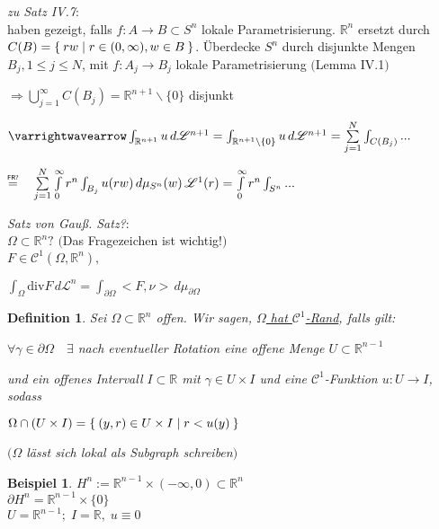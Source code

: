 \documentclass[11pt]{memoir}
\theoremstyle{changebreak}
\newtheorem{Definition}{Definition}[chapter]
\newtheorem{Beispiel}{Beispiel}[chapter]
\newcommand\overequal[1]{\mathrel{\overset{\makebox[0pt]{\mbox{\normalfont\tiny\sffamily $ #1 $}}}{=}}}
\begin{document}
\par\bigskip

\emph{zu Satz IV.7}: \\

haben gezeigt, falls $f: A \rightarrow B \subset S^n$ lokale Parametrisierung. $\mathbb R^n$ ersetzt durch $C(B) = \Set{rw | r \in (0, \infty), w \in B}$. Überdecke $S^n$ durch disjunkte Mengen $B_j, 1 \leq j \leq N$, mit
$f:A_j \rightarrow B_j$ lokale Parametrisierung $($Lemma IV.1$)$ 
\par
$\Rightarrow \bigcup\limits_{j=1}^\infty C(B_j) = \mathbb R^{n+1}\backslash \{0\}$ disjunkt 
\par\bigskip
$\varrightwavearrow \int_{\mathbb R^{n+1}} u \, d\mathscr L^{n+1} = \int_{\mathbb R^{n+1}\backslash \{0\}} u \, d \mathscr L^{n+1} = \sum\limits_{j=1}^N \int_{C(B_j)}...$
\par\bigskip
$\overequal{\text{FR?}} \quad \sum\limits_{j=1}^N \int\limits_0^\infty r^n \int_{B_j} u(rw) \,d\mu_{S^n}(w) \, \mathscr L^1(r) = \int\limits_0^\infty r^n \int_{S^n}...$


\par\bigskip
\emph{Satz von Gauß. Satz?}:\\
$\Omega \subset \mathbb R^n?$ $($Das Fragezeichen ist wichtig!$)$ \\
$F \in \mathscr C^1(\Omega, \mathbb R^n),$
\begin{center}
	$\int_\Omega \text{div} F \, d\mathscr L^n = \int_{\partial\Omega} <F, \nu> \, d\mu_{\partial\Omega}$
\end{center}

\begin{Definition}
Sei $\Omega \subset \mathbb R^n$ offen. Wir sagen, \underline{$\Omega$ hat $\mathscr C^1$-Rand}, falls gilt:
\begin{center}
	$\forall \gamma \in \partial\Omega \quad \exists$ nach eventueller Rotation eine offene Menge $U \subset \mathbb R^{n-1}$ 
\end{center}
und ein offenes Intervall $I \subset \mathbb R$ mit $\gamma \in U \times I$ und eine $\mathscr C^1$-Funktion $u: U \rightarrow I$, sodass 
\begin{center}
	$\Omega \cap (U \times I) = \Set{(y, r) \in U \times I | r < u(y)}$ 
\end{center}
$(\Omega$ lässt sich lokal als Subgraph schreiben$)$
\end{Definition}


\begin{Beispiel}
$H^n := \mathbb R^{n-1} \times (-\infty, 0) \subset \mathbb R^n$ \\
$\partial H^n = \mathbb R^{n-1} \times \{0\}$ \\
$U = \mathbb R^{n-1};\; I = \mathbb R, \;u \equiv 0$
\end{Beispiel}
\end{document}
